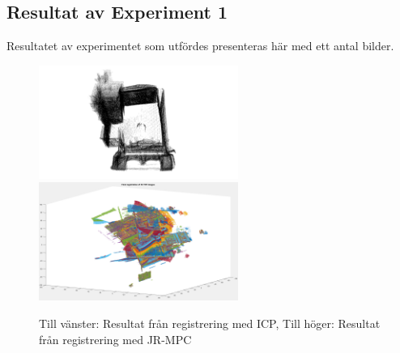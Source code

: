 \subsection{Resultat av Experiment 1}

Resultatet av experimentet som utfördes presenteras här med ett antal bilder.  

\begin{figure}[H]
	\centering
	\includegraphics[width=65mm]{figures/first_registered_church.png}
	\includegraphics[width=65mm]{figures/JRMPC_result.png}
	\caption{Till vänster: Resultat från registrering med ICP, Till höger: Resultat från registrering med JR-MPC}
	\label{fig:icp_vs_jrmpc_result}
\end{figure}

